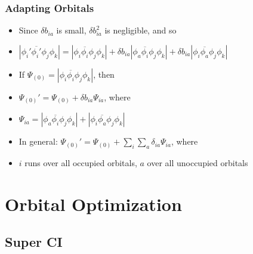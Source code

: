 \documentclass[]{beamer}
\begin{document}
\begin{frame}
  \frametitle{Adapting Orbitals}
  \begin{itemize}  
    \item \alert<+> {Since $\delta b_{ia}$ is small, $\delta b^2_{ia}$ is negligible, and so}
    \item \alert<+> {$|\phi_i'\overline{\phi_i'}\phi_j\phi_k | = |\phi_i\overline{\phi_i}\phi_j\phi_k| + \delta b_{ia}|\phi_a\overline{\phi_i}\phi_j\phi_k| + \delta b_{ia} |\phi_i\overline{\phi_a}\phi_j\phi_k|$}
    \item \alert<+> {If $\Psi_{(0)} = |\phi_i\overline{\phi_i}\phi_j\phi_k|$, then}
    \item \alert<+> {$\Psi_{(0)}' = \Psi_{(0)} + \delta b_{ia} \Psi_{ia}$, where}
    \item \alert<+> {$\Psi_{ia}=|\phi_a\overline{\phi_i}\phi_j\phi_k| + |\phi_i\overline{\phi_a}\phi_j\phi_k|$}
    \item \alert<+> {In general: $\Psi_{(0)}'=\Psi_{(0)}+\sum_i\sum_{a} \delta_{ia} \Psi_{ia}$, where}
    \item \alert<+> {$i$ runs over all occupied orbitals, $a$ over all unoccupied orbitals}
  \end{itemize}
\end{frame}

\section{Orbital Optimization}

\subsection{Super CI}
\end{document}
